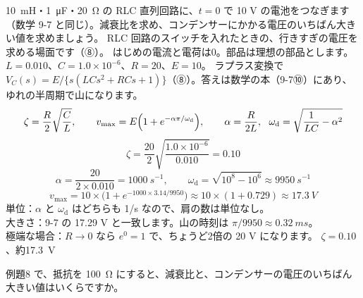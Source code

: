 \label{ph:電-9:ex8}
\begin{phreidai}
\qty{10}{mH}・\qty{1}{\micro F}・\qty{20}{\ohm} の RLC 直列回路に、$t=0$ で 10 V の電池をつなぎます（数学 9-7 と同じ）。減衰比を求め、コンデンサーにかかる電圧のいちばん大きい値を求めましょう。
\phbamen
RLC 回路のスイッチを入れたときの、行きすぎの電圧を求める場面です（⑧）。
\phmushi
はじめの電流と電荷は0。部品は理想の部品とします。
\phzu
$L=0.010$、$C=1.0\times10^{-6}$、$R=20$、$E=10$。
\phriyu
ラプラス変換で $V_C(s)=E/\{s(LCs^2+RCs+1)\}$（⑧）。答えは数学の本（9-7⑩）にあり、ゆれの半周期で山になります。
\phtateru
\[ \zeta=\frac{R}{2}\sqrt{\frac{C}{L}},\qquad v_{\max}=E\Bigl(1+e^{-\alpha\pi/\omega_{\mathrm d}}\Bigr),\qquad\alpha=\frac{R}{2L},\ \ \omega_{\mathrm d}=\sqrt{\frac{1}{LC}-\alpha^2} \]
\phtoku
\[ \zeta=\frac{20}{2}\sqrt{\frac{1.0\times10^{-6}}{0.010}}=0.10 \]
\[ \alpha=\frac{20}{2\times0.010}=\qty{1000}{s^{-1}},\qquad\omega_{\mathrm d}=\sqrt{10^8-10^6}\approx\qty{9950}{s^{-1}} \]
\[ v_{\max}=10\times\bigl(1+e^{-1000\times3.14/9950}\bigr)\approx10\times(1+0.729)\approx\qty{17.3}{V} \]
\phtashikame
単位：$\alpha$ と $\omega_{\mathrm d}$ はどちらも 1/s なので、肩の数は単位なし。\\
大きさ：9-7 の 17.29 V と一致します。山の時刻は $\pi/9950\approx\qty{0.32}{ms}$。\\
極端な場合：$R\to0$ なら $e^0=1$ で、ちょうど2倍の 20 V になります。
\kotae $\zeta=0.10$、約\qty{17.3}{V}
\end{phreidai}
\begin{jibun}
例題8 で、抵抗を \qty{100}{\ohm} にすると、減衰比と、コンデンサーの電圧のいちばん大きい値はいくらですか。
\end{jibun}


